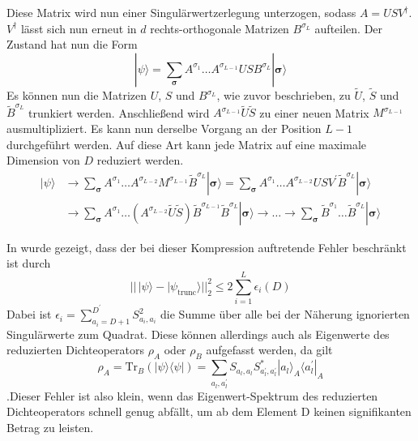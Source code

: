 \documentclass[10pt,a4paper]{report}
\begin{document}
Diese Matrix wird nun einer Singulärwertzerlegung unterzogen, sodass $A=USV^\dagger$. $V^\dagger$ lässt sich nun erneut in $d$ rechts-orthogonale Matrizen $B^{\sigma_L}$ aufteilen. Der Zustand hat nun die Form
\begin{equation}
|\psi\rangle=\sum_{\bm{\sigma}}A^{\sigma_1}\ldots A^{\sigma_{L-1}}USB^{\sigma_L}|\bm{\sigma}\rangle
\end{equation}
Es können nun die Matrizen $U$, $S$ und $B^{\sigma_L}$, wie zuvor beschrieben, zu $\tilde{U}$, $\tilde{S}$ und $\tilde{B}^{\sigma_L}$ trunkiert werden. Anschließend wird $A^{\sigma_{L-1}}\tilde{U}\tilde{S}$ zu einer neuen Matrix $M^{\sigma_{L-1}}$ ausmultipliziert. Es kann nun derselbe Vorgang an der Position $L-1$ durchgeführt werden. Auf diese Art kann jede  Matrix auf eine maximale Dimension von $D$ reduziert werden.
\begin{equation}
\begin{split}
|\psi\rangle&\rightarrow \sum_{\bm{\sigma}}A^{\sigma_1}\ldots A^{\sigma_{L-2}}M^{\sigma_{L-1}}\tilde{B}^{\sigma_L}|\bm{\sigma}\rangle = \sum_{\bm{\sigma}}A^{\sigma_1}\ldots A^{\sigma_{L-2}}USV^{\prime}\tilde{B}^{\sigma_L}|\bm{\sigma}\rangle\\
&\rightarrow \sum_{\bm{\sigma}}A^{\sigma_1}\ldots (A^{\sigma_{L-2}}\tilde{U}\tilde{S})\tilde{B}^{\sigma_{L-1}}\tilde{B}^{\sigma_L}|\bm{\sigma}\rangle\rightarrow \ldots\rightarrow\sum_{\bm{\sigma}}\tilde{B}^{\sigma_1}\ldots \tilde{B}^{\sigma_{L}}|\bm{\sigma}\rangle
\end{split}
\end{equation}

In \cite{MPS_error} wurde gezeigt, dass der bei dieser Kompression auftretende Fehler beschränkt ist durch
\begin{equation}
||\,|\psi\rangle-|\psi_{\text{trunc}}\rangle||_2^2\leq 2\sum_{i=1}^{L}\epsilon_i(D)
\end{equation}
Dabei ist $\epsilon_i=\sum_{a_i=D+1}^{D^{\prime}}S_{a_i,a_i}^2$ die Summe über alle bei der Näherung ignorierten Singulärwerte zum Quadrat. Diese können allerdings auch als Eigenwerte des reduzierten Dichteoperators $\rho_A$ oder $\rho_B$ aufgefasst werden, da gilt
\begin{equation}
\rho_A=\text{Tr}_B(|\psi\rangle\langle\psi|)=\sum_{a_l,a_l^{\prime}}S_{a_l,a_l}S_{a_l^{\prime},a_l^{\prime}}^{\ast}|a_l\rangle_A\langle a_l^{\prime}|_A
\end{equation}
.Dieser Fehler ist also klein, wenn das Eigenwert-Spektrum des reduzierten Dichteoperators schnell genug abfällt, um ab dem Element D keinen signifikanten Betrag zu leisten. 
\end{document}
